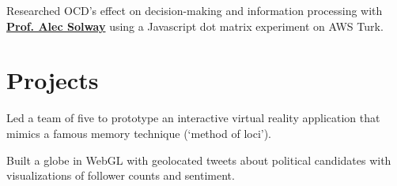 \documentclass[]{deedy-resume}
\begin{document}
\begin{minipage}[t]{0.66\textwidth}
Researched OCD's effect on decision-making and information processing with \textbf{\href{http://solwaylab.org/people/}{Prof. Alec Solway}} using a Javascript dot matrix experiment on AWS Turk.
\sectionsep %


\section{Projects}
\descript{}
Led a team of five to prototype an interactive virtual reality application that mimics a famous memory technique (`method of loci').
\sectionsep %

\descript{}
Built a globe in WebGL with geolocated tweets about political candidates with visualizations of follower counts and sentiment.
\sectionsep %





\end{minipage} 
\end{document}
